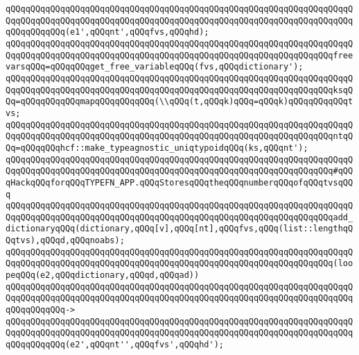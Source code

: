 \verb|qQQqqQQqqQQqqQQqqQQqqQQqqQQqqQQqqQQqqQQqqQQqqQQqqQQqqQQqqQQqqQQqqQQqqQQqqQQqqQQqqQQqqQQqqQQqqQQqqQQqqQQqqQQqqQQqqQQqqQQqqQQqqQQqqQQqqQQqqQQqqQQqqQQqqQQq(e1',qQQqnt',qQQqfvs,qQQqhd);|\newline
\newline
\verb|qQQqqQQqqQQqqQQqqQQqqQQqqQQqqQQqqQQqqQQqqQQqqQQqqQQqqQQqqQQqqQQqqQQqqQQqqQQqqQQqqQQqqQQqqQQqqQQqqQQqqQQqqQQqqQQqqQQqqQQqqQQqqQQqqQQqqQQqfreevarsqQQq=qQQqqQQqget_free_variableqQQq(fvs,qQQqdictionary');|\newline
\newline
\verb|qQQqqQQqqQQqqQQqqQQqqQQqqQQqqQQqqQQqqQQqqQQqqQQqqQQqqQQqqQQqqQQqqQQqqQQqqQQqqQQqqQQqqQQqqQQqqQQqqQQqqQQqqQQqqQQqqQQqqQQqqQQqqQQqqQQqqQQqksqQQq=qQQqqQQqqQQqmapqQQqqQQqqQQq(\\qQQq(t,qQQqk)qQQq=qQQqk)qQQqqQQqqQQqtvs;|\newline
\newline
\verb|qQQqqQQqqQQqqQQqqQQqqQQqqQQqqQQqqQQqqQQqqQQqqQQqqQQqqQQqqQQqqQQqqQQqqQQqqQQqqQQqqQQqqQQqqQQqqQQqqQQqqQQqqQQqqQQqqQQqqQQqqQQqqQQqqQQqqQQqntqQQq=qQQqqQQqhcf::make_typeagnostic_uniqtypoidqQQq(ks,qQQqnt');|\newline
\newline
\verb|qQQqqQQqqQQqqQQqqQQqqQQqqQQqqQQqqQQqqQQqqQQqqQQqqQQqqQQqqQQqqQQqqQQqqQQqqQQqqQQqqQQqqQQqqQQqqQQqqQQqqQQqqQQqqQQqqQQqqQQqqQQqqQQqqQQqqQQq#qQQqHackqQQqforqQQqTYPEFN_APP.qQQqStoresqQQqtheqQQqnumberqQQqofqQQqtvsqQQq|\newline
\newline
\verb|qQQqqQQqqQQqqQQqqQQqqQQqqQQqqQQqqQQqqQQqqQQqqQQqqQQqqQQqqQQqqQQqqQQqqQQqqQQqqQQqqQQqqQQqqQQqqQQqqQQqqQQqqQQqqQQqqQQqqQQqqQQqqQQqqQQqqQQqadd_dictionaryqQQq(dictionary,qQQq[v],qQQq[nt],qQQqfvs,qQQq(list::lengthqQQqtvs),qQQqd,qQQqnoabs);|\newline
\newline
\verb|qQQqqQQqqQQqqQQqqQQqqQQqqQQqqQQqqQQqqQQqqQQqqQQqqQQqqQQqqQQqqQQqqQQqqQQqqQQqqQQqqQQqqQQqqQQqqQQqqQQqqQQqqQQqqQQqqQQqqQQqqQQqqQQqqQQqqQQq(loopeqQQq(e2,qQQqdictionary,qQQqd,qQQqad))|\newline
\verb|qQQqqQQqqQQqqQQqqQQqqQQqqQQqqQQqqQQqqQQqqQQqqQQqqQQqqQQqqQQqqQQqqQQqqQQqqQQqqQQqqQQqqQQqqQQqqQQqqQQqqQQqqQQqqQQqqQQqqQQqqQQqqQQqqQQqqQQqqQQqqQQqqQQqqQQq->|\newline
\verb|qQQqqQQqqQQqqQQqqQQqqQQqqQQqqQQqqQQqqQQqqQQqqQQqqQQqqQQqqQQqqQQqqQQqqQQqqQQqqQQqqQQqqQQqqQQqqQQqqQQqqQQqqQQqqQQqqQQqqQQqqQQqqQQqqQQqqQQqqQQqqQQqqQQqqQQq(e2',qQQqnt'',qQQqfvs',qQQqhd');|\newline
\newline
